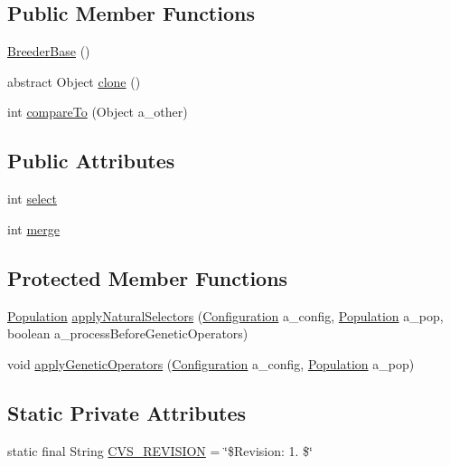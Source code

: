 \subsection*{Public Member Functions}
\begin{DoxyCompactItemize}
\item 
\hyperlink{classorg_1_1jgap_1_1_breeder_base_a1ce28560875364adb5ac369ad26aa0f1}{Breeder\-Base} ()
\item 
abstract Object \hyperlink{classorg_1_1jgap_1_1_breeder_base_aea55323a43089102e706f52ca5839611}{clone} ()
\item 
int \hyperlink{classorg_1_1jgap_1_1_breeder_base_ae3b27c2dffe2f0d3e189e5af354612e1}{compare\-To} (Object a\-\_\-other)
\end{DoxyCompactItemize}
\subsection*{Public Attributes}
\begin{DoxyCompactItemize}
\item 
int \hyperlink{classorg_1_1jgap_1_1_breeder_base_aabb0562c937ba7fee15a5760e83eafa5}{select}
\item 
int \hyperlink{classorg_1_1jgap_1_1_breeder_base_a4facd977a198d2377912156a74d87515}{merge}
\end{DoxyCompactItemize}
\subsection*{Protected Member Functions}
\begin{DoxyCompactItemize}
\item 
\hyperlink{classorg_1_1jgap_1_1_population}{Population} \hyperlink{classorg_1_1jgap_1_1_breeder_base_a3d2ad9ec1c90d78a5598a4dec1400960}{apply\-Natural\-Selectors} (\hyperlink{classorg_1_1jgap_1_1_configuration}{Configuration} a\-\_\-config, \hyperlink{classorg_1_1jgap_1_1_population}{Population} a\-\_\-pop, boolean a\-\_\-process\-Before\-Genetic\-Operators)
\item 
void \hyperlink{classorg_1_1jgap_1_1_breeder_base_ac2baa98b33eb5a909ffddc874598c1d2}{apply\-Genetic\-Operators} (\hyperlink{classorg_1_1jgap_1_1_configuration}{Configuration} a\-\_\-config, \hyperlink{classorg_1_1jgap_1_1_population}{Population} a\-\_\-pop)
\end{DoxyCompactItemize}
\subsection*{Static Private Attributes}
\begin{DoxyCompactItemize}
\item 
static final String \hyperlink{classorg_1_1jgap_1_1_breeder_base_aa8696d77b1b808a291d4760794651713}{C\-V\-S\-\_\-\-R\-E\-V\-I\-S\-I\-O\-N} = \char`\"{}\$Revision\-: 1. \$\char`\"{}
\end{DoxyCompactItemize}

